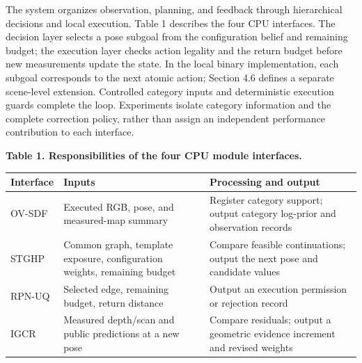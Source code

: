 \documentclass[11pt,a4paper]{article}
\newlength{\ReviewTableWidth}
\begin{document}
The system organizes observation, planning, and feedback through hierarchical decisions and local execution. Table 1 describes the four CPU interfaces. The decision layer selects a pose subgoal from the configuration belief and remaining budget; the execution layer checks action legality and the return budget before new measurements update the state. In the local binary implementation, each subgoal corresponds to the next atomic action; Section 4.6 defines a separate scene-level extension. Controlled category inputs and deterministic execution guards complete the loop. Experiments isolate category information and the complete correction policy, rather than assign an independent performance contribution to each interface.

\par\noindent\begin{minipage}{\linewidth}
\textbf{Table 1. Responsibilities of the four CPU module interfaces.}

\begin{center}
\small
\setlength{\tabcolsep}{4pt}
\setlength{\ReviewTableWidth}{\dimexpr\linewidth-4\tabcolsep\relax}
\begin{tabular}{@{}>{\raggedright\arraybackslash}p{0.28\ReviewTableWidth} >{\raggedright\arraybackslash}p{0.36\ReviewTableWidth} >{\raggedright\arraybackslash}p{0.36\ReviewTableWidth}@{}}
\toprule
Interface & Inputs & Processing and output \\
\midrule
OV-SDF & Executed RGB, pose, and measured-map summary & Register category support; output category log-prior and observation records \\
STGHP & Common graph, template exposure, configuration weights, remaining budget & Compare feasible continuations; output the next pose and candidate values \\
RPN-UQ & Selected edge, remaining budget, return distance & Output an execution permission or rejection record \\
IGCR & Measured depth/scan and public predictions at a new pose & Compare residuals; output a geometric evidence increment and revised weights \\
\bottomrule
\end{tabular}
\end{center}
\end{minipage}
\end{document}
